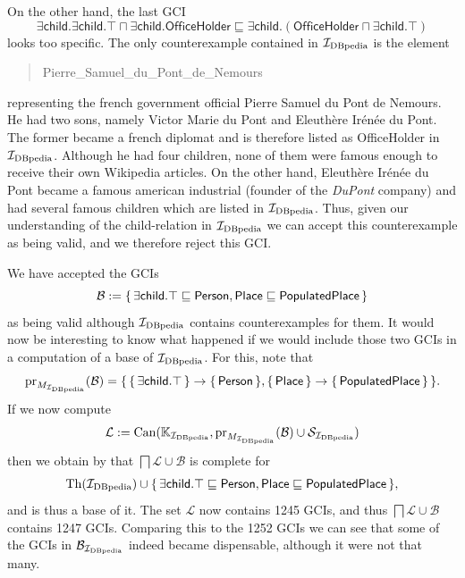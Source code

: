 On the other hand, the last GCI
\begin{equation*}
  \mathsf{\exists child. \exists child. \top \sqcap \exists child. OfficeHolder
    \sqsubseteq \exists child. ( OfficeHolder \sqcap \exists child. \top ) }
\end{equation*}
looks too specific.  The only counterexample contained in ${\mathcal{I}_{\text{DBpedia}}}$ is the element
\begin{quote}
  \textsf{Pierre\_Samuel\_du\_Pont\_de\_Nemours}
\end{quote}
representing the french government official Pierre Samuel du Pont de Nemours.  He had two
sons, namely Victor Marie du Pont and Eleuthère Irénée du Pont.  The former became a
french diplomat and is therefore listed as \textsf{OfficeHolder} in ${\mathcal{I}_{\text{DBpedia}}}$.  Although
he had four children, none of them were famous enough to receive their own Wikipedia
articles.  On the other hand, Eleuthère Irénée du Pont became a famous american industrial
(founder of the \emph{DuPont} company) and had several famous children which are listed in
${\mathcal{I}_{\text{DBpedia}}}$.  Thus, given our understanding of the \textsf{child}-relation in ${\mathcal{I}_{\text{DBpedia}}}$
we can accept this counterexample as being valid, and we therefore reject this GCI.

We have accepted the GCIs
\begin{equation*}
  \mathcal{B} := {\{\, \mathsf{\exists child. \top \sqsubseteq Person},
    \mathsf{Place \sqsubseteq PopulatedPlace} \,\}}
\end{equation*}
as being valid although ${\mathcal{I}_{\text{DBpedia}}}$ contains counterexamples for them.  It would now be
interesting to know what happened if we would include those two GCIs in a computation of a
base of ${\mathcal{I}_{\text{DBpedia}}}$.  For this, note that
\begin{equation*}
  \operatorname{pr}_{M_{{\mathcal{I}_{\text{DBpedia}}}}}(\mathcal{B}) = {\{\, {\{\, \mathsf{\exists child. \top} \,\}} \to {\ensuremath{\{\,
      \mathsf{Person} \,\}}}, {\{\, \mathsf{Place} \,\}} \to {\ensuremath{\{\, \mathsf{PopulatedPlace} \,\}}} \,\}}.
\end{equation*}
If we now compute
\begin{equation*}
  \mathcal{L} := \operatorname{Can}({\mathbb{K}}_{\mathcal{I}_{\text{DBpedia}}}, \operatorname{pr}_{M_{{\mathcal{I}_{\text{DBpedia}}}}}(\mathcal{B}) \cup
  \mathcal{S}_{{\mathcal{I}_{\text{DBpedia}}}} )
\end{equation*}
then we obtain by  that $\bigsqcap \mathcal{L}
\cup \mathcal{B}$ is complete for
\begin{equation*}
  \operatorname{Th}({\mathcal{I}_{\text{DBpedia}}}) \cup {\ensuremath{\{\, \mathsf{\exists child. \top \sqsubseteq Person },
    \mathsf{Place \sqsubseteq PopulatedPlace} \,\}}},
\end{equation*}
and is thus a base of it.  The set $\mathcal{L}$ now contains 1245 GCIs, and thus
$\bigsqcap \mathcal{L} \cup \mathcal{B}$ contains 1247 GCIs.  Comparing this to the 1252
GCIs we can see that some of the GCIs in $\mathcal{B}_{\mathcal{I}_{\text{DBpedia}}}$ indeed became
dispensable, although it were not that many.

